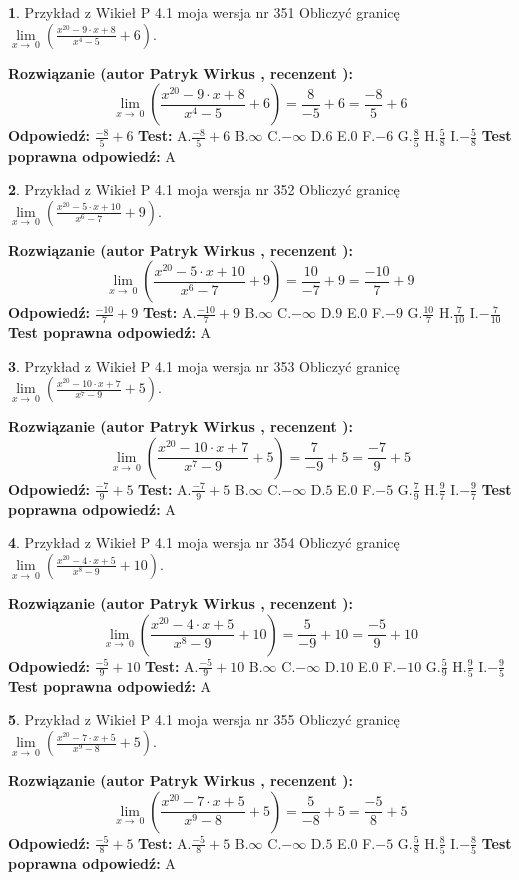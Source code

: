 \documentclass[12pt, a4paper]{article}
\theoremstyle{definition} %
\newtheorem{zad}{}
\newcommand{\zadStart}[1]{\begin{zad}#1\newline}
\newcommand{\zadStop}{\end{zad}}
\newcommand{\rozwStart}[2]{\noindent \textbf{Rozwiązanie (autor #1 , recenzent #2): }\newline}
\newcommand{\rozwStop}{\newline}
\newcommand{\odpStart}{\noindent \textbf{Odpowiedź:}\newline}
\newcommand{\odpStop}{\newline}
\newcommand{\testStart}{\noindent \textbf{Test:}\newline}
\newcommand{\testStop}{\newline}
\newcommand{\kluczStart}{\noindent \textbf{Test poprawna odpowiedź:}\newline}
\newcommand{\kluczStop}{\newline}
\begin{document}
\zadStart{Przykład z Wikieł P 4.1 moja wersja nr 351}
Obliczyć granicę $\lim\limits_{x\to\ 0}(\frac{x^{20}-9 \cdot x +8}{x^{4}-5}+6)$.
\zadStop
\rozwStart{Patryk Wirkus}{}
$$\lim\limits_{x\to\ 0}(\frac{x^{20}-9 \cdot x +8}{x^{4}-5}+6)=\frac{8}{-5}+6=\frac{-8}{5}+6$$
\rozwStop
\odpStart
$\frac{-8}{5}+6$
\odpStop
\testStart
A.$\frac{-8}{5}+6$
B.$\infty$
C.$-\infty$
D.$6$
E.$0$
F.$-6$
G.$\frac{8}{5}$
H.$\frac{5}{8}$
I.$-\frac{5}{8}$
\testStop
\kluczStart
A
\kluczStop



\zadStart{Przykład z Wikieł P 4.1 moja wersja nr 352}
Obliczyć granicę $\lim\limits_{x\to\ 0}(\frac{x^{20}-5 \cdot x +10}{x^{6}-7}+9)$.
\zadStop
\rozwStart{Patryk Wirkus}{}
$$\lim\limits_{x\to\ 0}(\frac{x^{20}-5 \cdot x +10}{x^{6}-7}+9)=\frac{10}{-7}+9=\frac{-10}{7}+9$$
\rozwStop
\odpStart
$\frac{-10}{7}+9$
\odpStop
\testStart
A.$\frac{-10}{7}+9$
B.$\infty$
C.$-\infty$
D.$9$
E.$0$
F.$-9$
G.$\frac{10}{7}$
H.$\frac{7}{10}$
I.$-\frac{7}{10}$
\testStop
\kluczStart
A
\kluczStop



\zadStart{Przykład z Wikieł P 4.1 moja wersja nr 353}
Obliczyć granicę $\lim\limits_{x\to\ 0}(\frac{x^{20}-10 \cdot x +7}{x^{7}-9}+5)$.
\zadStop
\rozwStart{Patryk Wirkus}{}
$$\lim\limits_{x\to\ 0}(\frac{x^{20}-10 \cdot x +7}{x^{7}-9}+5)=\frac{7}{-9}+5=\frac{-7}{9}+5$$
\rozwStop
\odpStart
$\frac{-7}{9}+5$
\odpStop
\testStart
A.$\frac{-7}{9}+5$
B.$\infty$
C.$-\infty$
D.$5$
E.$0$
F.$-5$
G.$\frac{7}{9}$
H.$\frac{9}{7}$
I.$-\frac{9}{7}$
\testStop
\kluczStart
A
\kluczStop



\zadStart{Przykład z Wikieł P 4.1 moja wersja nr 354}
Obliczyć granicę $\lim\limits_{x\to\ 0}(\frac{x^{20}-4 \cdot x +5}{x^{8}-9}+10)$.
\zadStop
\rozwStart{Patryk Wirkus}{}
$$\lim\limits_{x\to\ 0}(\frac{x^{20}-4 \cdot x +5}{x^{8}-9}+10)=\frac{5}{-9}+10=\frac{-5}{9}+10$$
\rozwStop
\odpStart
$\frac{-5}{9}+10$
\odpStop
\testStart
A.$\frac{-5}{9}+10$
B.$\infty$
C.$-\infty$
D.$10$
E.$0$
F.$-10$
G.$\frac{5}{9}$
H.$\frac{9}{5}$
I.$-\frac{9}{5}$
\testStop
\kluczStart
A
\kluczStop



\zadStart{Przykład z Wikieł P 4.1 moja wersja nr 355}
Obliczyć granicę $\lim\limits_{x\to\ 0}(\frac{x^{20}-7 \cdot x +5}{x^{9}-8}+5)$.
\zadStop
\rozwStart{Patryk Wirkus}{}
$$\lim\limits_{x\to\ 0}(\frac{x^{20}-7 \cdot x +5}{x^{9}-8}+5)=\frac{5}{-8}+5=\frac{-5}{8}+5$$
\rozwStop
\odpStart
$\frac{-5}{8}+5$
\odpStop
\testStart
A.$\frac{-5}{8}+5$
B.$\infty$
C.$-\infty$
D.$5$
E.$0$
F.$-5$
G.$\frac{5}{8}$
H.$\frac{8}{5}$
I.$-\frac{8}{5}$
\testStop
\kluczStart
A
\kluczStop
\end{document}
